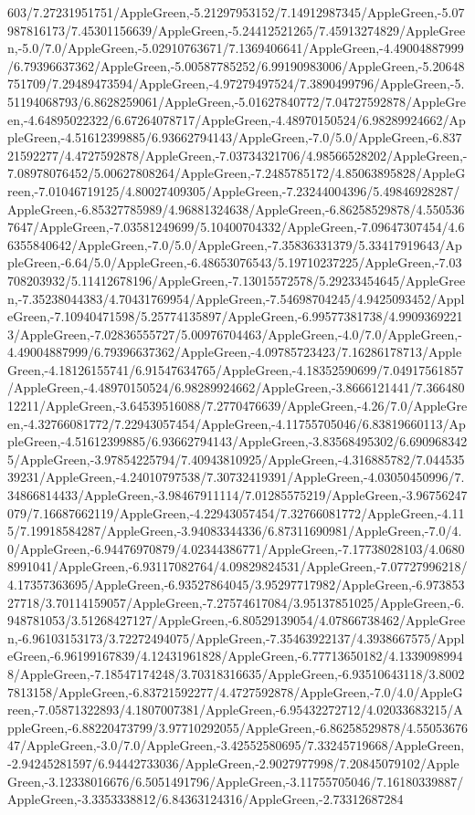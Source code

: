 {\begin{tikzternal}
603/7.27231951751/AppleGreen,-5.21297953152/7.14912987345/AppleGreen,-5.07987816173/7.45301156639/AppleGreen,-5.24412521265/7.45913274829/AppleGreen,-5.0/7.0/AppleGreen,-5.02910763671/7.1369406641/AppleGreen,-4.49004887999/6.79396637362/AppleGreen,-5.00587785252/6.99190983006/AppleGreen,-5.20648751709/7.29489473594/AppleGreen,-4.97279497524/7.3890499796/AppleGreen,-5.51194068793/6.8628259061/AppleGreen,-5.01627840772/7.04727592878/AppleGreen,-4.64895022322/6.67264078717/AppleGreen,-4.48970150524/6.98289924662/AppleGreen,-4.51612399885/6.93662794143/AppleGreen,-7.0/5.0/AppleGreen,-6.83721592277/4.4727592878/AppleGreen,-7.03734321706/4.98566528202/AppleGreen,-7.08978076452/5.00627808264/AppleGreen,-7.2485785172/4.85063895828/AppleGreen,-7.01046719125/4.80027409305/AppleGreen,-7.23244004396/5.49846928287/AppleGreen,-6.85327785989/4.96881324638/AppleGreen,-6.86258529878/4.5505367647/AppleGreen,-7.03581249699/5.10400704332/AppleGreen,-7.09647307454/4.66355840642/AppleGreen,-7.0/5.0/AppleGreen,-7.35836331379/5.33417919643/AppleGreen,-6.64/5.0/AppleGreen,-6.48653076543/5.19710237225/AppleGreen,-7.03708203932/5.11412678196/AppleGreen,-7.13015572578/5.29233454645/AppleGreen,-7.35238044383/4.70431769954/AppleGreen,-7.54698704245/4.9425093452/AppleGreen,-7.10940471598/5.25774135897/AppleGreen,-6.99577381738/4.99093692213/AppleGreen,-7.02836555727/5.00976704463/AppleGreen,-4.0/7.0/AppleGreen,-4.49004887999/6.79396637362/AppleGreen,-4.09785723423/7.16286178713/AppleGreen,-4.18126155741/6.91547634765/AppleGreen,-4.18352590699/7.04917561857/AppleGreen,-4.48970150524/6.98289924662/AppleGreen,-3.8666121441/7.36648012211/AppleGreen,-3.64539516088/7.2770476639/AppleGreen,-4.26/7.0/AppleGreen,-4.32766081772/7.22943057454/AppleGreen,-4.11755705046/6.83819660113/AppleGreen,-4.51612399885/6.93662794143/AppleGreen,-3.83568495302/6.6909683425/AppleGreen,-3.97854225794/7.40943810925/AppleGreen,-4.316885782/7.04453539231/AppleGreen,-4.24010797538/7.30732419391/AppleGreen,-4.03050450996/7.34866814433/AppleGreen,-3.98467911114/7.01285575219/AppleGreen,-3.96756247079/7.16687662119/AppleGreen,-4.22943057454/7.32766081772/AppleGreen,-4.115/7.19918584287/AppleGreen,-3.94083344336/6.87311690981/AppleGreen,-7.0/4.0/AppleGreen,-6.94476970879/4.02344386771/AppleGreen,-7.17738028103/4.06808991041/AppleGreen,-6.93117082764/4.09829824531/AppleGreen,-7.07727996218/4.17357363695/AppleGreen,-6.93527864045/3.95297717982/AppleGreen,-6.97385327718/3.70114159057/AppleGreen,-7.27574617084/3.95137851025/AppleGreen,-6.948781053/3.51268427127/AppleGreen,-6.80529139054/4.07866738462/AppleGreen,-6.96103153173/3.72272494075/AppleGreen,-7.35463922137/4.3938667575/AppleGreen,-6.96199167839/4.12431961828/AppleGreen,-6.77713650182/4.13390989948/AppleGreen,-7.18547174248/3.70318316635/AppleGreen,-6.93510643118/3.80027813158/AppleGreen,-6.83721592277/4.4727592878/AppleGreen,-7.0/4.0/AppleGreen,-7.05871322893/4.1807007381/AppleGreen,-6.95432272712/4.02033683215/AppleGreen,-6.88220473799/3.97710292055/AppleGreen,-6.86258529878/4.5505367647/AppleGreen,-3.0/7.0/AppleGreen,-3.42552580695/7.33245719668/AppleGreen,-2.94245281597/6.94442733036/AppleGreen,-2.9027977998/7.20845079102/AppleGreen,-3.12338016676/6.5051491796/AppleGreen,-3.11755705046/7.16180339887/AppleGreen,-3.3353338812/6.84363124316/AppleGreen,-2.73312687284
\end{tikzternal}}
